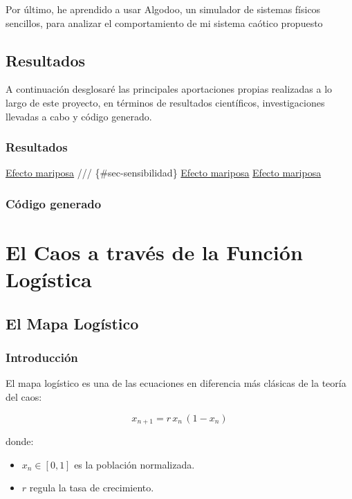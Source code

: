 \documentclass[
  11pt,
  a4paper,
  DIV=11,
  numbers=noendperiod]{scrreprt}
\providecommand{\tightlist}{%
  \setlength{\itemsep}{0pt}\setlength{\parskip}{0pt}}
\begin{document}
Por último, he aprendido a usar Algodoo, un simulador de sistemas
físicos sencillos, para analizar el comportamiento de mi sistema caótico
propuesto

\chapter{Resultados}\label{resultados}

A continuación desglosaré las principales aportaciones propias
realizadas a lo largo de este proyecto, en términos de resultados
científicos, investigaciones llevadas a cabo y código generado.

\section{Resultados}\label{resultados-1}

\hyperref[sec-sensibilidad]{Efecto mariposa} /// \{\#sec-sensibilidad\}
\hyperref[sec-inestabilidad]{Efecto mariposa}
\hyperref[sec-exponente]{Efecto mariposa}

\section{Código generado}\label{cuxf3digo-generado}

\part{El Caos a través de la Función Logística}

\chapter{El Mapa Logístico}\label{el-mapa-loguxedstico}

\section{Introducción}\label{introducciuxf3n-1}

El mapa logístico es una de las ecuaciones en diferencia más clásicas de
la teoría del caos:

\[
x_{n+1} = r\,x_n\,(1 - x_n)
\]

donde:

\begin{itemize}
\tightlist
\item
  \(x_n \in [0,1]\) es la población normalizada.
\item
  \(r\) regula la tasa de crecimiento.
\end{itemize}
\end{document}
